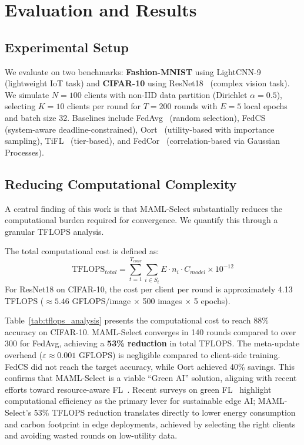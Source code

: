 \documentclass[journal]{IEEEtran}
\begin{document}
\section{Evaluation and Results}

\subsection{Experimental Setup}
We evaluate on two benchmarks: \textbf{Fashion-MNIST} using LightCNN-9~\cite{wu2018light} (lightweight IoT task) and \textbf{CIFAR-10} using ResNet18~\cite{he2016deep} (complex vision task). We simulate $N = 100$ clients with non-IID data partition (Dirichlet $\alpha = 0.5$), selecting $K = 10$ clients per round for $T = 200$ rounds with $E = 5$ local epochs and batch size 32. Baselines include FedAvg~\cite{mcmahan2017communication} (random selection), FedCS~\cite{nishio2019client} (system-aware deadline-constrained), Oort~\cite{lai2021oort} (utility-based with importance sampling), TiFL~\cite{chai2020tifl} (tier-based), and FedCor~\cite{tang2022fedcor} (correlation-based via Gaussian Processes).

\subsection{Reducing Computational Complexity}
A central finding of this work is that MAML-Select substantially reduces the computational burden required for convergence. We quantify this through a granular TFLOPS analysis.

The total computational cost is defined as:
\begin{equation}
	\text{TFLOPS}_{total} = \sum_{t=1}^{T_{conv}} \sum_{i \in S_t} E \cdot n_i \cdot C_{model} \times 10^{-12}
	\label{eq:tflops}
\end{equation}
For ResNet18 on CIFAR-10, the cost per client per round is approximately 4.13 TFLOPS ($\approx 5.46$ GFLOPS/image $\times$ 500 images $\times$ 5 epochs).

Table~\ref{tab:tflops_analysis} presents the computational cost to reach 88\% accuracy on CIFAR-10. MAML-Select converges in 140 rounds compared to over 300 for FedAvg, achieving a \textbf{53\% reduction} in total TFLOPS. The meta-update overhead ($\varepsilon \approx 0.001$ GFLOPS) is negligible compared to client-side training. FedCS did not reach the target accuracy, while Oort achieved 40\% savings. This confirms that MAML-Select is a viable ``Green AI'' solution, aligning with recent efforts toward resource-aware FL~\cite{thakur2025grace}. Recent surveys on green FL~\cite{thakur2025greensurvey} highlight computational efficiency as the primary lever for sustainable edge AI; MAML-Select's 53\% TFLOPS reduction translates directly to lower energy consumption and carbon footprint in edge deployments, achieved by selecting the right clients and avoiding wasted rounds on low-utility data.
\end{document}
